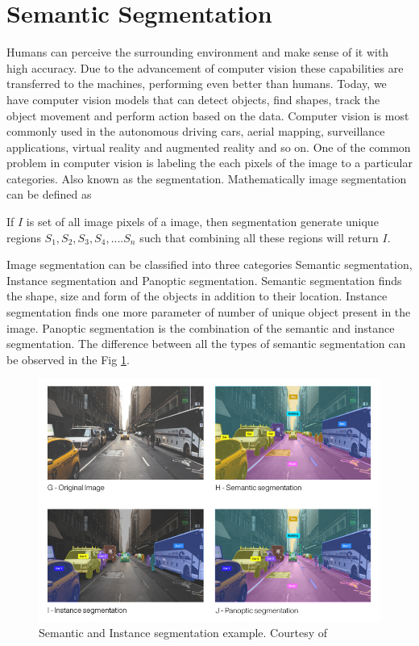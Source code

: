     \section{Semantic Segmentation}
    \label{sec:semseg}
    
    Humans can perceive the surrounding environment and make sense of it with high accuracy. Due to the advancement of computer vision these capabilities are transferred to the machines, performing even better than humans. Today, we have computer vision models that can detect objects, find shapes, track the object movement and perform action based on the data. Computer vision is most commonly used in the autonomous driving cars, aerial mapping, surveillance applications, virtual reality and augmented reality and so on. One of the common problem in computer vision is labeling the each pixels of the image to a particular categories. Also known as the segmentation. Mathematically image segmentation can be defined as
     
    If $I$ is set of all image pixels of a image, then segmentation generate unique regions ${S_1, S_2, S_3, S_4,....S_n}$ such that combining all these regions will return $I$. 
   
    Image segmentation can be classified into three categories Semantic segmentation, Instance segmentation and Panoptic segmentation. Semantic segmentation finds the shape, size and form of the objects in addition to their location. Instance segmentation finds one more parameter of number of unique object present in the image. Panoptic segmentation is the combination of the semantic and instance segmentation. The difference between all the types of semantic segmentation can be observed in the Fig \ref{fig:SS}.
    
    \begin{figure}[h]
    	\centering
    	\includegraphics[width=12cm]{images/ss.jpg}
    	\caption{Semantic and Instance segmentation example. Courtesy of \cite{55_WinNT}}
    	\label{fig:SS}
    \end{figure}
    
